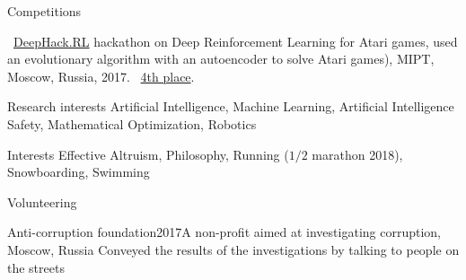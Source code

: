 \documentclass{resume} %
\begin{document}

\begin{rSection}{Competitions}
\vspace{-1em}
\item \faExternalLink~\href{http://web.archive.org/web/20170224094223/http://rl.deephack.me/}{DeepHack.RL} hackathon on Deep Reinforcement Learning for Atari games, used an evolutionary algorithm with an autoencoder to solve Atari games), MIPT, Moscow, Russia, 2017. \faExternalLink~\href{https://github.com/sergeivolodin/deephack.rl}{4th place}.
\end{rSection}

\begin{rSection}{Research interests}
	Artificial Intelligence, Machine Learning, Artificial Intelligence Safety, Mathematical Optimization, Robotics
\end{rSection}

\begin{rSection}{Interests}
	Effective Altruism, Philosophy, Running ($1/2$ marathon 2018), Snowboarding, Swimming
\end{rSection}

\begin{rSection}{Volunteering}
	\begin{rSubsection}{Anti-corruption foundation}{2017}{A non-profit aimed at investigating corruption, Moscow, Russia}{}
		 Conveyed the results of the investigations by talking to people on the streets
	\end{rSubsection}
\end{rSection}
\end{document}
